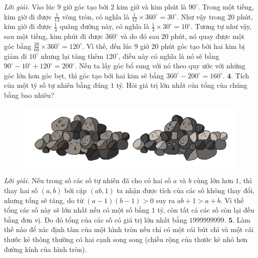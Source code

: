 \begin{multicols}{2}
	\textit{Lời giải.} 	Vào lúc $9$ giờ góc tạo bởi $2$ kim giờ và kim phút là $90^\circ$. Trong một tiếng, kim giờ đi được $\frac{1}{12}$ vòng tròn, có nghĩa là $\frac{1}{12}\times 360^\circ = 30^\circ$. Như vậy trong $20$ phút, kim giờ đi được $\frac{1}{3}$ quãng đường này, có nghĩa là $\frac{1}{3}\times 30^\circ=10^\circ$. Tương tự như vậy, sau một tiếng, kim phút đi được $360^\circ$ và do đó sau $20$ phút, nó quay được một góc bằng $\frac{20}{60}\times 360^\circ=120^\circ$. Vì thế, đến lúc $9$ giờ $20$ phút góc tạo bởi hai kim bị giảm đi $10^\circ$ nhưng lại tăng thêm $120^\circ$, điều này có nghĩa là nó sẽ bằng $90^\circ-10^\circ+120^\circ=200^\circ$. Nếu ta lấy góc bổ sung với nó theo quy ước với những góc lớn hơn góc bẹt, thì góc tạo bởi hai kim sẽ bằng $360^\circ-200^\circ=160^\circ$.
	\vskip 0.1cm
	$\pmb{4.}$ Tích của một tỷ số tự nhiên bằng đúng $1$ tỷ. Hỏi giá trị lớn nhất của tổng của chúng bằng bao nhiêu?
	\begin{figure}[H]
			\centering
			\vspace*{-10pt}
			\captionsetup{labelformat= empty, justification=centering}
			\includegraphics[width=0.7\linewidth]{bai5}
			\vspace*{-10pt}
		\end{figure}
	\textit{Lời giải.} 	Nếu trong số các số tự nhiên đã cho có hai số $a$ và $b$ cùng lớn hơn $1$, thì thay hai số $(a,b)$ bởi cặp $(ab,1)$ ta nhận được tích của các số không thay đổi, nhưng tổng  sẽ tăng, do từ $(a-1)(b-1) >0$ suy ra $ab+1 > a+b$. Vì thế tổng các số này sẽ lớn nhất nếu có một số bằng $1$ tỷ, còn tất cả các số còn lại đều bằng đơn vị. Do đó tổng của các số có giá trị lớn nhất bằng $1 999 999 999$.
	\vskip 0.1cm
	$\pmb{5.}$ Làm thế nào để xác định tâm của một hình tròn nếu chỉ có một cái bút chì và một cái thước kẻ thông thường có hai cạnh song song (chiều rộng của thước kẻ nhỏ hơn đường kính của hình tròn).
	\begin{figure}[H]

\end{figure}
\end{multicols}
